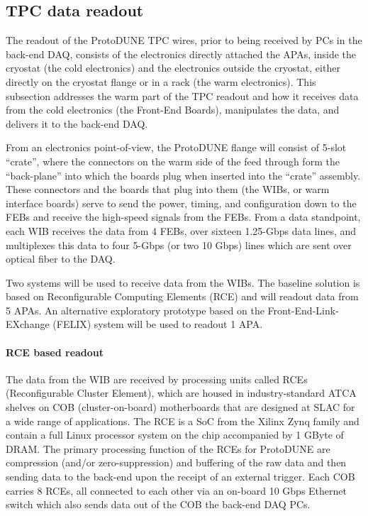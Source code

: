\subsection{TPC data readout}


The readout of the ProtoDUNE TPC wires, prior to being received by PCs in
the back-end DAQ, consists of the electronics directly attached the APAs,
inside the cryostat (the cold electronics) and the electronics outside
the cryostat, either directly on the cryostat flange or in a rack (the
warm electronics).  This subsection
addresses the warm part of the TPC
readout and how it receives data from the cold electronics (the Front-End
Boards), manipulates the data, and delivers it to the back-end DAQ.

From an electronics point-of-view, the ProtoDUNE flange will consist of
5-slot ``crate'', where the connectors on the warm side of the feed
through form the ``back-plane'' into which the boards plug when inserted
into the ``crate'' assembly.  These connectors and the boards that plug
into them (the WIBs, or warm interface boards) serve to send the power,
timing, and configuration down to the FEBs and receive the high-speed
signals from the FEBs. From a data standpoint, each WIB receives the
data from 4 FEBs, over sixteen 1.25-Gbps data lines, and multiplexes
this data to four 5-Gbps (or two 10 Gbps) lines which are sent over
optical fiber to the DAQ.

Two systems will be used to receive data from the WIBs.  The baseline
solution is based on Reconfigurable Computing Elements (RCE) and will
readout data from 5 APAs.  An alternative exploratory prototype based on
the Front-End-Link-EXchange (FELIX) system will be used to readout 1 APA.

\paragraph{RCE based readout}
The data from the WIB are received by processing units called RCEs (Reconfigurable Cluster Element), 
\cite{slac:rce}
which are housed in industry-standard
ATCA shelves on COB (cluster-on-board) motherboards that are designed
at SLAC for a wide range of applications.   The RCE is a SoC 
from the
Xilinx Zynq family and contain a full Linux processor system on the chip
accompanied by 1 GByte of DRAM.   The primary processing function of the
RCEs for ProtoDUNE are compression (and/or zero-suppression) and buffering
of the raw data and then sending data to the back-end upon the receipt of
an external trigger.  Each COB carries 8 RCEs, all connected to each
other via an on-board 10 Gbps Ethernet switch which also sends data out
of the COB the back-end DAQ PCs.

